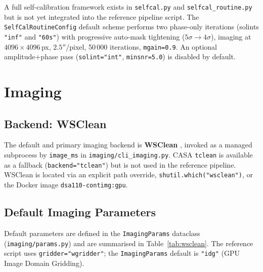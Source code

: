 \documentclass[12pt,a4paper]{article}
\begin{document}
A full self-calibration framework exists in \texttt{selfcal.py} and
\texttt{selfcal\_routine.py} but is not yet integrated into the reference
pipeline script.  The \texttt{SelfCalRoutineConfig} default scheme performs
two phase-only iterations (solints \texttt{"inf"} and \texttt{"60s"}) with
progressive auto-mask tightening ($5\sigma \to 4\sigma$), imaging at
$4096 \times 4096$\,px, $2.5''$/pixel, 50\,000 iterations, \texttt{mgain=0.9}.
An optional amplitude+phase pass (\texttt{solint="int"}, \texttt{minsnr=5.0})
is disabled by default.

\section{Imaging}

\subsection{Backend: WSClean}

The default and primary imaging backend is \textbf{WSClean}
\cite{offringa2014wsclean}, invoked as a managed subprocess by
\texttt{image\_ms} in \texttt{imaging/cli\_imaging.py}.  CASA
\texttt{tclean} is available as a fallback (\texttt{backend="tclean"})
but is not used in the reference pipeline.  WSClean is located via an
explicit path override, \texttt{shutil.which("wsclean")}, or the Docker
image \texttt{dsa110-contimg:gpu}.

\subsection{Default Imaging Parameters}

Default parameters are defined in the \texttt{ImagingParams} dataclass
(\texttt{imaging/params.py}) and are summarised in Table~\ref{tab:wsclean}.
The reference script uses \texttt{gridder="wgridder"}; the
\texttt{ImagingParams} default is \texttt{"idg"} (GPU Image Domain Gridding).
\end{document}

